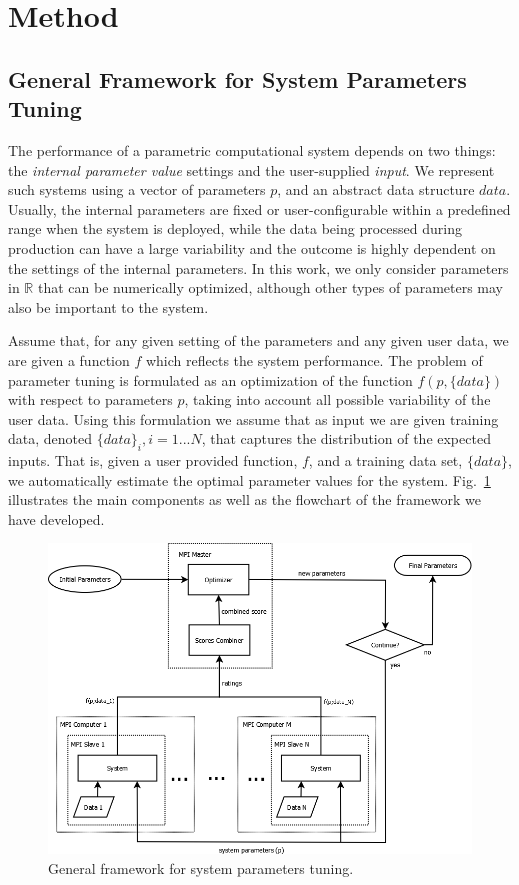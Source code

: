 \documentclass[]{spie}  %
\begin{document}
\section{Method}

\subsection{General Framework for System Parameters Tuning}

The performance of a parametric computational system depends on two things: the \emph{internal parameter value} settings and the user-supplied \emph{input}. We represent such systems using a vector of parameters $p$, and an abstract data structure $data$. Usually, the internal parameters are fixed or user-configurable within a predefined range when the system is deployed, while the data being processed during
production can have a large variability and the outcome is highly dependent on the settings of the internal parameters. In this work, we only consider parameters in $\mathbb{R}$ that can be numerically optimized, although other types of parameters may also be important to the system.

Assume that, for any given setting of the parameters and any given user data, we are given a function $f$ which reflects the system performance. The problem of parameter tuning is formulated as an optimization of the function $f(p,\{data\})$ with respect to parameters $p$, taking into account all possible variability of the user data. Using this formulation we assume that as input we are given training data, denoted $\{data\}_i, i=1...N$, that captures the distribution of the expected inputs. That is, given a user provided function, $f$, and a training data set, $\{data\}$, we automatically estimate the optimal parameter values for the system. Fig.~\ref{fig:spt_framework} illustrates the main components as well as the flowchart of the framework we have developed.

\begin{figure}[tb!]
\begin{center}
\includegraphics[width=5in]{framework}
\end{center}
\caption{General framework for system parameters tuning.}
\label{fig:spt_framework}
\end{figure}
\end{document}
